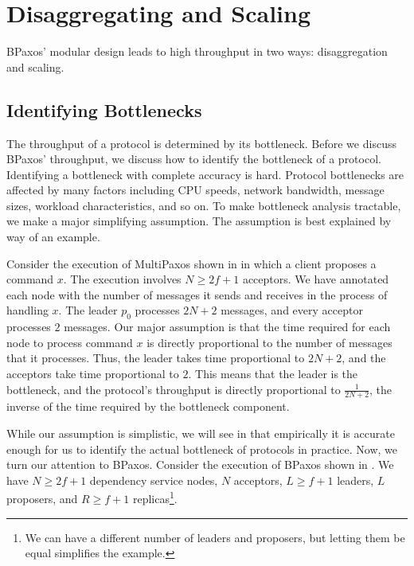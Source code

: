 \section{Disaggregating and Scaling}
BPaxos' modular design leads to high throughput in two ways: disaggregation and
scaling.

\subsection{Identifying Bottlenecks}
The throughput of a protocol is determined by its bottleneck. Before we discuss
BPaxos' throughput, we discuss how to identify the bottleneck of a protocol.
Identifying a bottleneck with complete accuracy is hard. Protocol bottlenecks
are affected by many factors including CPU speeds, network bandwidth, message
sizes, workload characteristics, and so on. To make bottleneck analysis
tractable, we make a major simplifying assumption. The assumption is best
explained by way of an example.

{}

Consider the execution of MultiPaxos shown in  in
which a client proposes a command $x$. The execution involves $N \geq 2f+1$
acceptors. We have annotated each node with the number of messages it sends and
receives in the process of handling $x$. The leader $p_0$ processes $2N+2$
messages, and every acceptor processes $2$ messages. Our major assumption is
that the time required for each node to process command $x$ is directly
proportional to the number of messages that it processes. Thus, the leader
takes time proportional to $2N+2$, and the acceptors take time proportional to
$2$. This means that the leader is the bottleneck, and the protocol's
throughput is directly proportional to $\frac{1}{2N+2}$, the inverse of the
time required by the bottleneck component.

While our assumption is simplistic, we will see in  that
empirically it is accurate enough for us to identify the actual bottleneck of
protocols in practice. Now, we turn our attention to BPaxos. Consider the
execution of BPaxos shown in . We have $N \geq 2f+1$
dependency service nodes, $N$ acceptors, $L \geq f+1$ leaders, $L$ proposers,
and $R \geq f+1$ replicas\footnote{We can have a different number of leaders
and proposers, but letting them be equal simplifies the example.}.

{}

